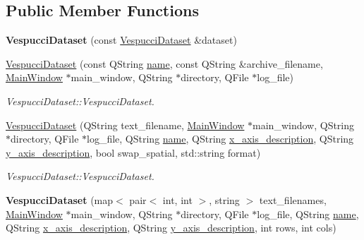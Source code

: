 \subsection*{Public Member Functions}
\begin{DoxyCompactItemize}
\item 
{\bfseries Vespucci\+Dataset} (const \hyperlink{class_vespucci_dataset}{Vespucci\+Dataset} \&dataset)\hypertarget{class_vespucci_dataset_acdb8eac7a6160db7a373995a79f8208f}{}\label{class_vespucci_dataset_acdb8eac7a6160db7a373995a79f8208f}

\item 
\hyperlink{class_vespucci_dataset_a0cf3cd3d0ee31ad0bb32aac6955cf918}{Vespucci\+Dataset} (const Q\+String \hyperlink{class_vespucci_dataset_a345a51b60127316b41caf92dc88fd792}{name}, const Q\+String \&archive\+\_\+filename, \hyperlink{class_main_window}{Main\+Window} $\ast$main\+\_\+window, Q\+String $\ast$directory, Q\+File $\ast$log\+\_\+file)
\begin{DoxyCompactList}\small\item\em Vespucci\+Dataset\+::\+Vespucci\+Dataset. \end{DoxyCompactList}\item 
\hyperlink{class_vespucci_dataset_a06df54f3af54a6a7dcd2d93fced57275}{Vespucci\+Dataset} (Q\+String text\+\_\+filename, \hyperlink{class_main_window}{Main\+Window} $\ast$main\+\_\+window, Q\+String $\ast$directory, Q\+File $\ast$log\+\_\+file, Q\+String \hyperlink{class_vespucci_dataset_a345a51b60127316b41caf92dc88fd792}{name}, Q\+String \hyperlink{class_vespucci_dataset_a7fb9e44d71e9e874eab1f5daaef86a5a}{x\+\_\+axis\+\_\+description}, Q\+String \hyperlink{class_vespucci_dataset_a997026da2bb3693568f62e156f9a5e49}{y\+\_\+axis\+\_\+description}, bool swap\+\_\+spatial, std\+::string format)
\begin{DoxyCompactList}\small\item\em Vespucci\+Dataset\+::\+Vespucci\+Dataset. \end{DoxyCompactList}\item 
{\bfseries Vespucci\+Dataset} (map$<$ pair$<$ int, int $>$, string $>$ text\+\_\+filenames, \hyperlink{class_main_window}{Main\+Window} $\ast$main\+\_\+window, Q\+String $\ast$directory, Q\+File $\ast$log\+\_\+file, Q\+String \hyperlink{class_vespucci_dataset_a345a51b60127316b41caf92dc88fd792}{name}, Q\+String \hyperlink{class_vespucci_dataset_a7fb9e44d71e9e874eab1f5daaef86a5a}{x\+\_\+axis\+\_\+description}, Q\+String \hyperlink{class_vespucci_dataset_a997026da2bb3693568f62e156f9a5e49}{y\+\_\+axis\+\_\+description}, int rows, int cols)\hypertarget{class_vespucci_dataset_a958627d705127f0ff75d1bf81bbd54a8}{}\label{class_vespucci_dataset_a958627d705127f0ff75d1bf81bbd54a8}


\end{DoxyCompactItemize}
